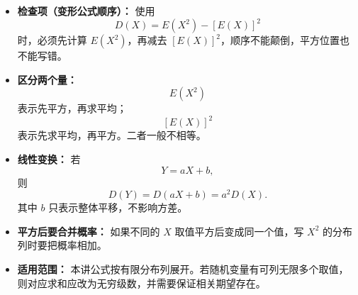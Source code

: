 \begin{summarybox}
\begin{itemize}[leftmargin=*, itemsep=0.5em, topsep=0.4em]
		\item \textbf{检查项（变形公式顺序）：}
		      使用
		      \[
			      D(X)=E(X^2)-[E(X)]^2
		      \]
		      时，必须先计算 $E(X^2)$，再减去 $[E(X)]^2$，顺序不能颠倒，平方位置也不能写错。

		\item \textbf{区分两个量：}
		      \[
			      E(X^2)
		      \]
		      表示先平方，再求平均；
		      \[
			      [E(X)]^2
		      \]
		      表示先求平均，再平方。二者一般不相等。

		\item \textbf{线性变换：}
		      若
		      \[
			      Y=aX+b,
		      \]
		      则
		      \[
			      D(Y)=D(aX+b)=a^2D(X).
		      \]
		      其中 $b$ 只表示整体平移，不影响方差。

		\item \textbf{平方后要合并概率：}
		      如果不同的 $X$ 取值平方后变成同一个值，写 $X^2$ 的分布列时要把概率相加。

		\item \textbf{适用范围：}
		      本讲公式按有限分布列展开。若随机变量有可列无限多个取值，则对应求和应改为无穷级数，并需要保证相关期望存在。
	\end{itemize}
\end{summarybox}